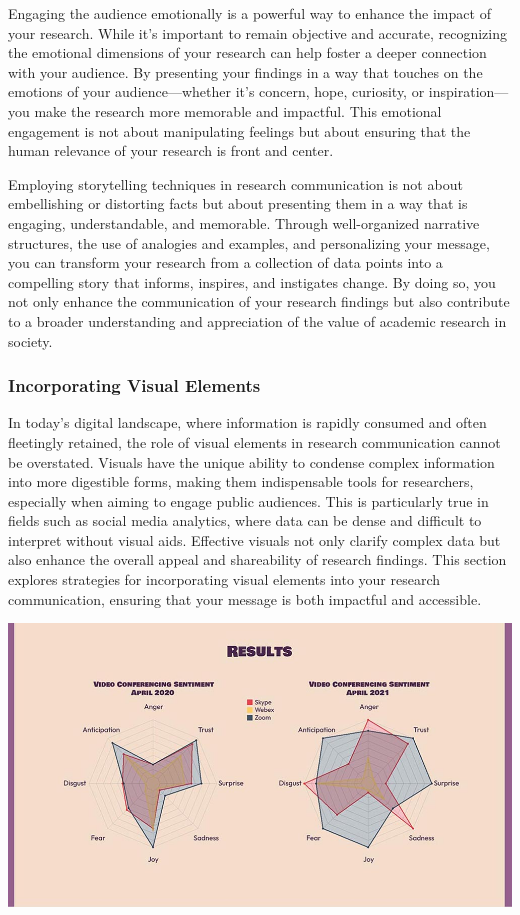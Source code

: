 \documentclass[
]{book}
\begin{document}
Engaging the audience emotionally is a powerful way to enhance the impact of your research. While it's important to remain objective and accurate, recognizing the emotional dimensions of your research can help foster a deeper connection with your audience. By presenting your findings in a way that touches on the emotions of your audience---whether it's concern, hope, curiosity, or inspiration---you make the research more memorable and impactful. This emotional engagement is not about manipulating feelings but about ensuring that the human relevance of your research is front and center.

Employing storytelling techniques in research communication is not about embellishing or distorting facts but about presenting them in a way that is engaging, understandable, and memorable. Through well-organized narrative structures, the use of analogies and examples, and personalizing your message, you can transform your research from a collection of data points into a compelling story that informs, inspires, and instigates change. By doing so, you not only enhance the communication of your research findings but also contribute to a broader understanding and appreciation of the value of academic research in society.

\subsubsection*{Incorporating Visual Elements}\label{incorporating-visual-elements}

In today's digital landscape, where information is rapidly consumed and often fleetingly retained, the role of visual elements in research communication cannot be overstated. Visuals have the unique ability to condense complex information into more digestible forms, making them indispensable tools for researchers, especially when aiming to engage public audiences. This is particularly true in fields such as social media analytics, where data can be dense and difficult to interpret without visual aids. Effective visuals not only clarify complex data but also enhance the overall appeal and shareability of research findings. This section explores strategies for incorporating visual elements into your research communication, ensuring that your message is both impactful and accessible.

\includegraphics[width=1\textwidth,height=\textheight]{images/fig089.jpg}
\end{document}
